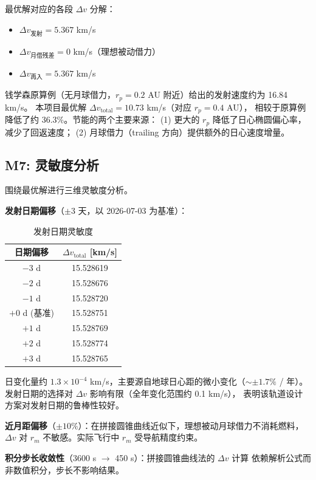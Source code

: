 \documentclass[12pt,a4paper]{ctexart}
\begin{document}
最优解对应的各段 $\Delta v$ 分解：
\begin{itemize}
\item $\Delta v_{\text{发射}} = 5.367$ km/s
\item $\Delta v_{\text{月借残差}} = 0$ km/s（理想被动借力）
\item $\Delta v_{\text{再入}} = 5.367$ km/s
\end{itemize}

钱学森原算例（无月球借力，$r_p = 0.2$ AU 附近）给出的发射速度约为 16.84 km/s。
本项目最优解 $\Delta v_{\text{total}} = 10.73$ km/s（对应 $r_p = 0.4$ AU），
相较于原算例降低了约 36.3\%。节能的两个主要来源：
(1) 更大的 $r_p$ 降低了日心椭圆偏心率，减少了回返速度；
(2) 月球借力（trailing 方向）提供额外的日心速度增量。

\subsection{M7: 灵敏度分析}

围绕最优解进行三维灵敏度分析。

\textbf{发射日期偏移}（$\pm 3$ 天，以 2026-07-03 为基准）：
\begin{table}[H]
\centering
\caption{发射日期灵敏度}
\begin{tabular}{cc}
\toprule
日期偏移 & $\Delta v_{\text{total}}$ [km/s] \\
\midrule
$-3$ d & 15.528619 \\
$-2$ d & 15.528676 \\
$-1$ d & 15.528720 \\
$+0$ d (基准) & 15.528751 \\
$+1$ d & 15.528769 \\
$+2$ d & 15.528774 \\
$+3$ d & 15.528765 \\
\bottomrule
\end{tabular}
\end{table}

日变化量约 $1.3 \times 10^{-4}$ km/s，主要源自地球日心距的微小变化（$\sim \pm 1.7\%$ / 年）。
发射日期的选择对 $\Delta v$ 影响有限（全年变化范围约 0.1 km/s），
表明该轨道设计方案对发射日期的鲁棒性较好。

\textbf{近月距偏移}（$\pm 10\%$）：在拼接圆锥曲线近似下，理想被动月球借力不消耗燃料，
$\Delta v$ 对 $r_m$ 不敏感。实际飞行中 $r_m$ 受导航精度约束。

\textbf{积分步长收敛性}（3600 s $\to$ 450 s）：拼接圆锥曲线法的 $\Delta v$ 计算
依赖解析公式而非数值积分，步长不影响结果。
\end{document}
